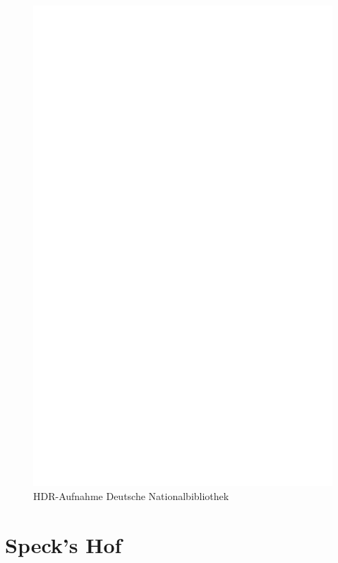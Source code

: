 \documentclass[liststotoc,bibtotoc,fontsize=14pt,]{scrreprt}
\begin{document}
	
			 \newpage
			 \begin{figure}[h]
			 	\includegraphics[width=\linewidth]{img/ph.jpg}
			 	\caption{HDR-Aufnahme Deutsche Nationalbibliothek}
			 \end{figure}

	

	
		\section{Speck's Hof}
	\label{sec:speck}
\end{document}
